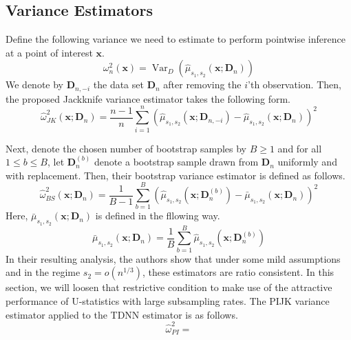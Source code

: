 \documentclass[letterpaper,10pt]{article}
\numberwithin{equation}{section}
\numberwithin{thm}{section}
\numberwithin{lem}{section}
\numberwithin{cor}{section}
\renewcommand{\hat}{\widehat}
\newcommand{\1}{\mathbb{1}}
\begin{document}
\subsection{Variance Estimators}\label{Var_Ests}
Define the following variance we need to estimate to perform pointwise inference at a point of interest $\mathbf{x}$.
\begin{equation}
	\omega^{2}_{n}\left(\mathbf{x}\right)
	= \operatorname{Var}_{D}\left(\hat{\mu}_{s_1, s_2}\left(\mathbf{x}; \mathbf{D}_n\right)\right)
\end{equation}
We denote by $\mathbf{D}_{n, -i}$ the data set $\mathbf{D}_n$ after removing the $i$'th observation.
Then, the proposed Jackknife variance estimator takes the following form.
\begin{equation}
	\hat{\omega}_{JK}^2\left(\mathbf{x}; \mathbf{D}_n\right)
	= \frac{n-1}{n} \sum_{i = 1}^{n}\left(\hat{\mu}_{s_1, s_2}\left(\mathbf{x}; \mathbf{D}_{n, -i}\right) - \hat{\mu}_{s_1, s_2}\left(\mathbf{x}; \mathbf{D}_{n}\right)\right)^2
\end{equation}

Next, denote the chosen number of bootstrap samples by $B \geq 1$ and for all $1 \leq b \leq B$, let $\mathbf{D}^{(b)}_n$ denote a bootstrap sample drawn from $\mathbf{D}_n$ uniformly and with replacement.
Then, their bootstrap variance estimator is defined as follows.
\begin{equation}
	\hat{\omega}_{BS}^2\left(\mathbf{x}; \mathbf{D}_n\right)
	= \frac{1}{B - 1}\sum_{b = 1}^{B} \left(\hat{\mu}_{s_1, s_2}\left(\mathbf{x}; \mathbf{D}_{n}^{(b)}\right) - \bar{\mu}_{s_1, s_2}\left(\mathbf{x}; \mathbf{D}_{n}\right)\right)^2
\end{equation}
Here, $\bar{\mu}_{s_1, s_2}\left(\mathbf{x}; \mathbf{D}_{n}\right)$ is defined in the fllowing way.
\begin{equation}
	\bar{\mu}_{s_1, s_2}\left(\mathbf{x}; \mathbf{D}_{n}\right)
	= \frac{1}{B} \sum_{b = 1}^{B} \hat{\mu}_{s_1, s_2}\left(\mathbf{x}; \mathbf{D}_{n}^{(b)}\right)
\end{equation}
In their resulting analysis, the authors show that under some mild assumptions and in the regime $s_2 = o(n^{1/3})$, these estimators are ratio consistent.
In this section, we will loosen that restrictive condition to make use of the attractive performance of U-statistics with large subsampling rates.
The PIJK variance estimator applied to the TDNN estimator is as follows.
\begin{equation}
	\hat{\omega}_{PI}^2
	=
\end{equation}
\end{document}
